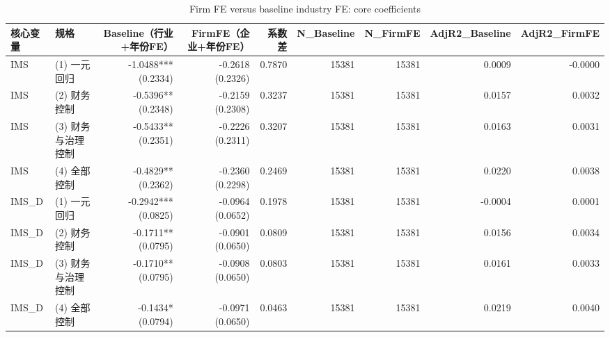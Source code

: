 \begin{table}
\caption{Firm FE versus baseline industry FE: core coefficients}
\label{tab:firm-fe-vs-baseline}
\begin{tabular}{llrrrrrrr}
\toprule
核心变量 & 规格 & Baseline（行业+年份FE） & FirmFE（企业+年份FE） & 系数差 & N\_Baseline & N\_FirmFE & AdjR2\_Baseline & AdjR2\_FirmFE \\
\midrule
IMS & (1) 一元回归 & -1.0488*** (0.2334) & -0.2618 (0.2326) & 0.7870 & 15381 & 15381 & 0.0009 & -0.0000 \\
IMS & (2) 财务控制 & -0.5396** (0.2348) & -0.2159 (0.2308) & 0.3237 & 15381 & 15381 & 0.0157 & 0.0032 \\
IMS & (3) 财务与治理控制 & -0.5433** (0.2351) & -0.2226 (0.2311) & 0.3207 & 15381 & 15381 & 0.0163 & 0.0031 \\
IMS & (4) 全部控制 & -0.4829** (0.2362) & -0.2360 (0.2298) & 0.2469 & 15381 & 15381 & 0.0220 & 0.0038 \\
IMS\_D & (1) 一元回归 & -0.2942*** (0.0825) & -0.0964 (0.0652) & 0.1978 & 15381 & 15381 & -0.0004 & 0.0001 \\
IMS\_D & (2) 财务控制 & -0.1711** (0.0795) & -0.0901 (0.0650) & 0.0809 & 15381 & 15381 & 0.0156 & 0.0034 \\
IMS\_D & (3) 财务与治理控制 & -0.1710** (0.0795) & -0.0908 (0.0650) & 0.0803 & 15381 & 15381 & 0.0161 & 0.0033 \\
IMS\_D & (4) 全部控制 & -0.1434* (0.0794) & -0.0971 (0.0650) & 0.0463 & 15381 & 15381 & 0.0219 & 0.0040 \\
\bottomrule
\end{tabular}
\end{table}
